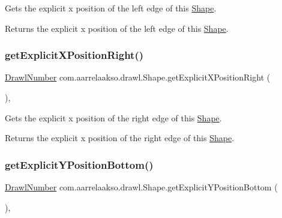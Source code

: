 Gets the explicit x position of the left edge of this \hyperlink{classcom_1_1aarrelaakso_1_1drawl_1_1_shape}{Shape}. 

\begin{DoxyReturn}{Returns}
the explicit x position of the left edge of this \hyperlink{classcom_1_1aarrelaakso_1_1drawl_1_1_shape}{Shape}. 
\end{DoxyReturn}
\mbox{\label{classcom_1_1aarrelaakso_1_1drawl_1_1_shape_a19970b658b55e4e61de31aaaef8cf7fe}} 
\subsubsection{\texorpdfstring{get\+Explicit\+X\+Position\+Right()}{getExplicitXPositionRight()}}
{\footnotesize\ttfamily \hyperlink{classcom_1_1aarrelaakso_1_1drawl_1_1_drawl_number}{Drawl\+Number} com.\+aarrelaakso.\+drawl.\+Shape.\+get\+Explicit\+X\+Position\+Right (\begin{DoxyParamCaption}{ }\end{DoxyParamCaption})\hspace{0.3cm}{\ttfamily [protected]}, {\ttfamily [inherited]}}



Gets the explicit x position of the right edge of this \hyperlink{classcom_1_1aarrelaakso_1_1drawl_1_1_shape}{Shape}. 

\begin{DoxyReturn}{Returns}
the explicit x position of the right edge of this \hyperlink{classcom_1_1aarrelaakso_1_1drawl_1_1_shape}{Shape}. 
\end{DoxyReturn}
\mbox{\label{classcom_1_1aarrelaakso_1_1drawl_1_1_shape_aa26eb0263851ed8f8221bf3740e6e584}} 
\subsubsection{\texorpdfstring{get\+Explicit\+Y\+Position\+Bottom()}{getExplicitYPositionBottom()}}
{\footnotesize\ttfamily \hyperlink{classcom_1_1aarrelaakso_1_1drawl_1_1_drawl_number}{Drawl\+Number} com.\+aarrelaakso.\+drawl.\+Shape.\+get\+Explicit\+Y\+Position\+Bottom (\begin{DoxyParamCaption}{ }\end{DoxyParamCaption})\hspace{0.3cm}{\ttfamily [protected]}, {\ttfamily [inherited]}}



